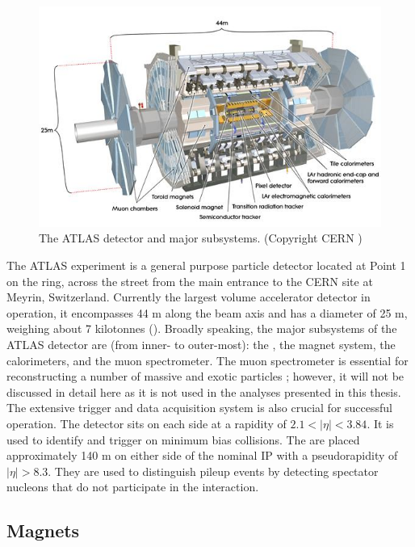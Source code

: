 \begin{figure}[t]
\includegraphics{ATLAS_layout.jpg}
\caption{The ATLAS detector and major subsystems. (Copyright CERN \cite{Pequenao:1095924})}
\label{fig:atlas_layout}
\end{figure}

The ATLAS experiment is a general purpose particle detector \cite{Aad:2008zzm} located at Point 1 on the \lhc ring, across the street from the main entrance to the CERN site at Meyrin, Switzerland.
Currently the largest volume accelerator detector in operation, it encompasses 44 m along the beam axis and has a diameter of 25 m, weighing about 7 kilotonnes ().
Broadly speaking, the major subsystems of the ATLAS detector are (from inner- to outer-most): the \id, the magnet system, the calorimeters, and the muon spectrometer.
The muon spectrometer is essential for reconstructing a number of massive and exotic particles \cite{ATLAS:1997ad}; however, it will not be discussed in detail here as it is not used in the analyses presented in this thesis.
The extensive trigger and data acquisition system is also crucial for successful operation.
The \mbts detector sits on each side at a rapidity of $2.1 < |\eta| < 3.84$.
It is used to identify and trigger on minimum bias collisions.
The \zdc are placed approximately 140 m on either side of the nominal \ac{IP} with a pseudorapidity of $|\eta| > 8.3$.
They are used to distinguish pileup events by detecting spectator nucleons that do not participate in the interaction.


\subsection{Magnets}
\label{subsec:atlas_magnet}

